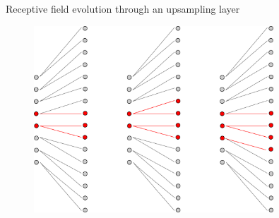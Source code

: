 \documentclass[xcolor=pdftex,dvipsnames,table,mathserif]{beamer}
\begin{document}
\begin{frame}{Receptive field evolution through an upsampling layer}

  \begin{figure}
  \includegraphics[width=0.8\textwidth]{receptive_field_upsampling.png}
  \end{figure}

\end{frame}
\end{document}
